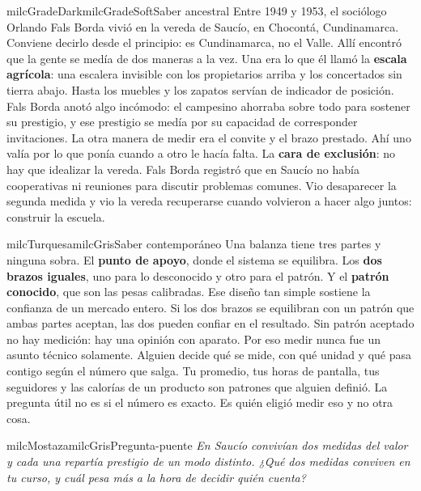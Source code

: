 \documentclass[11pt,letterpaper]{article}
\begin{document}
\begin{softbox}{milcGradeDark}{milcGradeSoft}{Saber ancestral}
Entre 1949 y 1953, el sociólogo Orlando Fals Borda vivió en la vereda de Saucío, en Chocontá, Cundinamarca. Conviene decirlo desde el principio: es Cundinamarca, no el Valle. Allí encontró que la gente se medía de dos maneras a la vez. Una era lo que él llamó la \textbf{escala agrícola}: una escalera invisible con los propietarios arriba y los concertados sin tierra abajo. Hasta los muebles y los zapatos servían de indicador de posición. Fals Borda anotó algo incómodo: el campesino ahorraba sobre todo para sostener su prestigio, y ese prestigio se medía por su capacidad de corresponder invitaciones. La otra manera de medir era el convite y el brazo prestado. Ahí uno valía por lo que ponía cuando a otro le hacía falta. La \textbf{cara de exclusión}: no hay que idealizar la vereda. Fals Borda registró que en Saucío no había cooperativas ni reuniones para discutir problemas comunes. Vio desaparecer la segunda medida y vio la vereda recuperarse cuando volvieron a hacer algo juntos: construir la escuela.\par{}
\end{softbox}

\begin{softbox}{milcTurquesa}{milcGris}{Saber contemporáneo}
Una balanza tiene tres partes y ninguna sobra. El \textbf{punto de apoyo}, donde el sistema se equilibra. Los \textbf{dos brazos iguales}, uno para lo desconocido y otro para el patrón. Y el \textbf{patrón conocido}, que son las pesas calibradas. Ese diseño tan simple sostiene la confianza de un mercado entero. Si los dos brazos se equilibran con un patrón que ambas partes aceptan, las dos pueden confiar en el resultado. Sin patrón aceptado no hay medición: hay una opinión con aparato. Por eso medir nunca fue un asunto técnico solamente. Alguien decide qué se mide, con qué unidad y qué pasa contigo según el número que salga. Tu promedio, tus horas de pantalla, tus seguidores y las calorías de un producto son patrones que alguien definió. La pregunta útil no es si el número es exacto. Es quién eligió medir eso y no otra cosa.
\end{softbox}

\begin{softbox}{milcMostaza}{milcGris}{Pregunta-puente}
\textit{En Saucío convivían dos medidas del valor y cada una repartía prestigio de un modo distinto. ¿Qué dos medidas conviven en tu curso, y cuál pesa más a la hora de decidir quién cuenta?}
\end{softbox}
\end{document}
